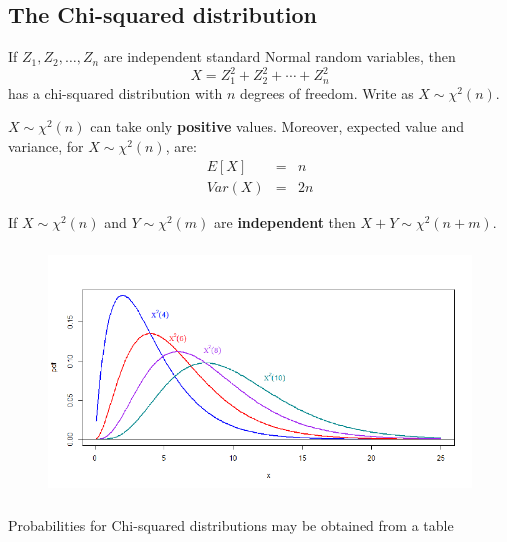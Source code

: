 \documentclass[notes=show,smaller,handout]{beamer}\usepackage[]{graphicx}\usepackage[]{color}
\begin{document}

%
%
%
%
%




\subsection{The Chi-squared distribution}

\begin{frame}{\subsecname}
  \begin{definition}
  If $Z_{1},Z_{2},\ldots ,Z_{n}$ are independent standard Normal random
  variables, then%
  \begin{equation*}
  X=Z_{1}^{2}+Z_{2}^{2}+\cdots +Z_{n}^{2}
  \end{equation*}%
  has a chi-squared distribution with $n$ degrees of freedom. Write as $X\sim \chi ^{2}(n)$.
  \end{definition}

  $X\sim \chi ^{2}(n)$ can take only \textbf{positive }values. Moreover, expected value and variance, for $X\sim \chi ^{2}(n)$, are:
  \begin{eqnarray*}
  E\left[ X\right] &=&n \\
  Var\left( X\right) &=&2n
  \end{eqnarray*}

  If $X\sim \chi ^{2}(n)$ and $Y\sim \chi ^{2}(m)$ are \textbf{%
  independent} then $X+Y\sim \chi ^{2}(n+m)$.
\end{frame}

\begin{frame}{\subsecname}

\begin{figure}[ptb]\centering
\includegraphics[height=2.6143in, width=4.6643in]{img/chisquared_pdfs__2.pdf}%
\end{figure}

Probabilities for Chi-squared distributions may be obtained from a table

\end{frame}%
\end{document}
